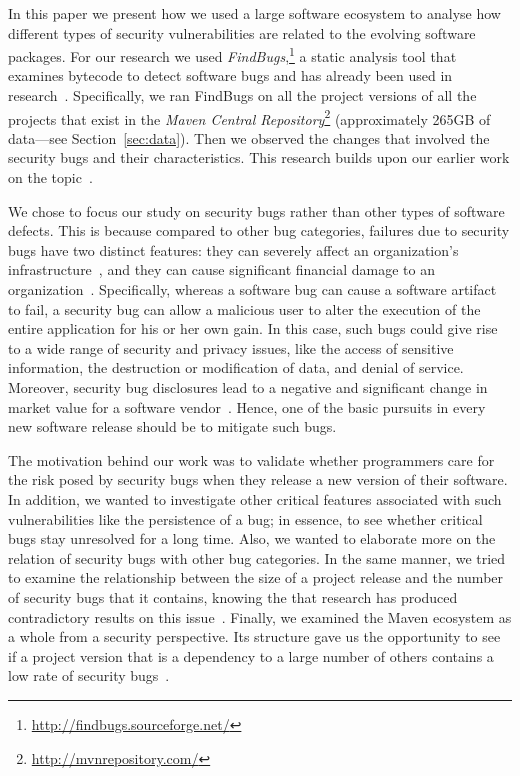 \documentclass{sig-alternate}
\begin{document}
In this
paper we present how we used a large software ecosystem to analyse how different
types of security vulnerabilities are related to the evolving software packages.
For our research we used {\it FindBugs},\footnote{\url{http://findbugs.sourceforge.net/}}
a static analysis tool that examines bytecode to detect software bugs and has already been used in
research~\cite{AP10,HP07,HW08,SHP06}.
Specifically, we ran FindBugs on all the project
versions of all the projects that exist in the
{\it Maven Central Repository}\footnote{\url{http://mvnrepository.com/}}
(approximately 265GB of data---see Section~\ref{sec:data}).
Then we observed the changes that involved the security bugs and their characteristics.
This research builds upon our earlier work on the topic~\cite{MGS12}.

We chose to focus our study on security bugs rather than other types of
software defects. This is because compared to other bug categories,
failures due to security bugs have two distinct features:
they can severely affect an organization's infrastructure~\cite{SZ12}, and
they can cause significant financial damage to
an organization~\cite{TH04,BCL08,R06}. 
Specifically,
whereas a software bug can cause a software artifact to fail,
a security bug can allow a malicious user to alter the execution
of the entire application for his or her own gain.
In this case, such bugs could give rise to a wide
range of security and privacy issues, like
the access of sensitive information,
the destruction or modification of data, and
denial of service.	
Moreover, security bug disclosures lead to a negative and significant change
in market value for a software vendor~\cite{TW07}.
Hence, one of the basic pursuits in every new software release should
be to mitigate such bugs.

The motivation behind our work was to validate whether programmers care for
the risk posed by security bugs when they release a new version of their software.
In addition, we wanted to investigate other critical features associated with such
vulnerabilities like the persistence of a bug;
in essence, to see whether critical bugs stay unresolved for a long time.
Also, we wanted to elaborate more on the relation of security
bugs with other bug categories.
In the same manner, we tried to examine the relationship
between the size of a project release and the number of security bugs that it contains,
knowing the that research has produced contradictory results on this
issue~\cite{BP84,SYTP85,NBZ06,GKMS00}.
Finally, we examined the Maven ecosystem as a whole from a security
perspective. Its structure gave us the opportunity to see if a project version that is a dependency to
a large number of others contains a low rate of security bugs~\cite{MW10}.
\end{document}
